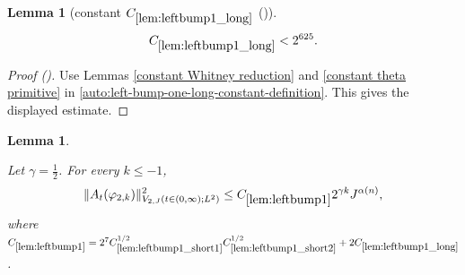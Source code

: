 \documentclass[12pt,reqno]{amsart}
\newcommand{\auto}{{({\tiny\faCar})}}
\theoremstyle{plain}
\newtheorem{lemma}[theorem]{Lemma}
\numberwithin{equation}{section}
\theoremstyle{remark}
\newcommand{\uses}[1]{}
\newcommand{\usesdefs}[1]{}
\begin{document}
\begin{lemma}[constant $C_{\ref{lem:leftbump1_long}}$ \auto]\label{constant left bump one long}\uses{constant Whitney reduction,constant theta primitive,lem:leftbump1_long}\usesdefs{}
\begin{equation}\label{constant left bump one long bound}
C_{\ref{lem:leftbump1_long}}<2^{625}.
\end{equation}
\end{lemma}
\begin{proof}[Proof \auto]
Use Lemmas \ref{constant Whitney reduction} and \ref{constant theta primitive} in \eqref{auto:left-bump-one-long-constant-definition}. This gives the displayed estimate.
\end{proof}


\begin{lemma}\label{lem:leftbump1}\uses{lem:rescaling,lem:shortlongjumps,lem:leftbump1_long,lem:leftbump1_short1,lem:leftbump1_short2,lem:ftccs-R,lem:ftc_ATphi}\usesdefs{A_def,defn:window based bump functions}

Let $\gamma=\frac12$. For every $k\le -1$,
\begin{equation}\label{leftbump1}
\|A_{t}(\varphi_{2,k})\|_{V_{2,J}(t\in(0,\infty);L^2)}^2  \le C_{\ref{lem:leftbump1}} 2^{\gamma k} J^{\alpha(n)}, \end{equation}
where  $C_{\ref{lem:leftbump1}}
=2^7C_{\ref{lem:leftbump1_short1}}^{1/2}C_{\ref{lem:leftbump1_short2}}^{1/2}
+2C_{\ref{lem:leftbump1_long}}$.
\end{lemma}
\end{document}

